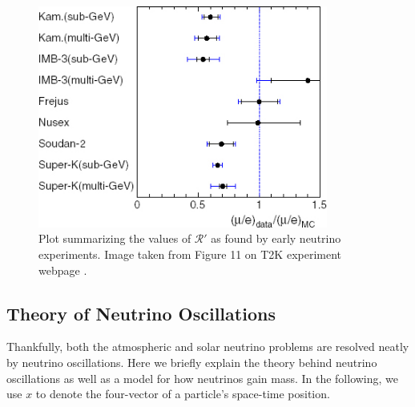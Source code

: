 \begin{figure}
  \centering
  \includegraphics[width=0.85\textwidth,height=0.25\textheight,keepaspectratio]
                {pictures/dblratio.jpg}
  \vspace*{10mm}
  \caption{Plot summarizing the values of $\mathcal{R}'$ as found by early
           neutrino experiments. Image taken from Figure 11 on T2K experiment
           webpage \cite{T2}.}
\end{figure}

\subsection{Theory of Neutrino Oscillations}
Thankfully, both the atmospheric and solar neutrino problems are resolved
neatly by neutrino oscillations.
Here we briefly explain the theory behind neutrino oscillations as well as a
model for how neutrinos gain mass. In the following, we use $x$ to denote
the four-vector of a particle's space-time position.


